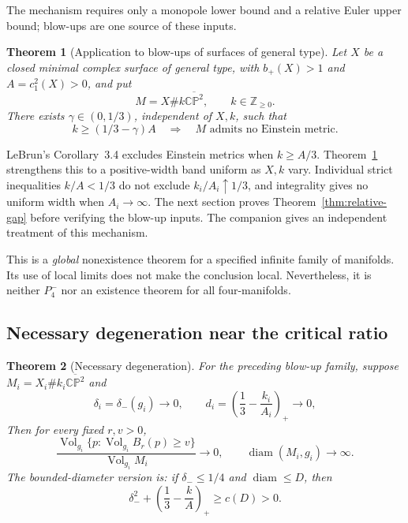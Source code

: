 \documentclass[a4paper,11pt]{article}
\numberwithin{equation}{section}
\newtheorem{theorem}{Theorem}[section]
\theoremstyle{definition}
\newcommand{\Vol}{\operatorname{Vol}}
\newcommand{\diam}{\operatorname{diam}}
\newcommand{\CP}{\mathbb{CP}}
\newcommand{\Z}{\mathbb Z}
\begin{document}
The mechanism requires only a monopole lower bound and a relative Euler upper bound; blow-ups are one source of these inputs.
\begin{theorem}[Application to blow-ups of surfaces of general type]\label{thm:topgap}
Let $X$ be a closed minimal complex surface of general type, with $b_+(X)>1$ and $A=c_1^2(X)>0$, and put
\[
M=X\#k\overline{\CP^2},\qquad k\in\Z_{\ge0}.
\]
There exists $\gamma\in(0,1/3)$, independent of $X,k$, such that
\begin{equation}\label{eq:topgap}
 k\ge(1/3-\gamma)A\quad\Longrightarrow\quad
 M\text{ admits no Einstein metric}.
\end{equation}
\end{theorem}

LeBrun's Corollary~3.4 excludes Einstein metrics when $k\ge A/3$\cite{LeBrun2001}. Theorem~\ref{thm:topgap} strengthens this to a positive-width band uniform as $X,k$ vary. Individual strict inequalities $k/A<1/3$ do not exclude $k_i/A_i\uparrow1/3$, and integrality gives no uniform width when $A_i\to\infty$. The next section proves Theorem~\ref{thm:relative-gap} before verifying the blow-up inputs. The companion  gives an independent treatment of this mechanism.

This is a \emph{global} nonexistence theorem for a specified infinite family of manifolds. Its use of local limits does not make the conclusion local. Nevertheless, it is neither $P_4^-$ nor an existence theorem for all four-manifolds.

\subsection{Necessary degeneration near the critical ratio}
\begin{theorem}[Necessary degeneration]\label{thm:collapse}
For the preceding blow-up family, suppose $M_i=X_i\#k_i\overline{\CP^2}$ and
\[
\delta_i=\delta_-(g_i)\longrightarrow0,
\qquad d_i=\left(\frac13-\frac{k_i}{A_i}\right)_+\longrightarrow0,
\]
Then for every fixed $r,v>0$,
\begin{equation}\label{eq:measurecollapse}
\frac{\Vol_{g_i}\{p:\Vol_{g_i}B_r(p)\ge v\}}
{\Vol_{g_i}M_i}\longrightarrow0,
\qquad \diam(M_i,g_i)\longrightarrow\infty.
\end{equation}
The bounded-diameter version is: if $\delta_-\le1/4$ and $\diam\le D$, then
\begin{equation}\label{eq:diambound}
\delta_-^2+\left(\frac13-\frac{k}{A}\right)_+\ge c(D)>0.
\end{equation}
\end{theorem}
\end{document}
